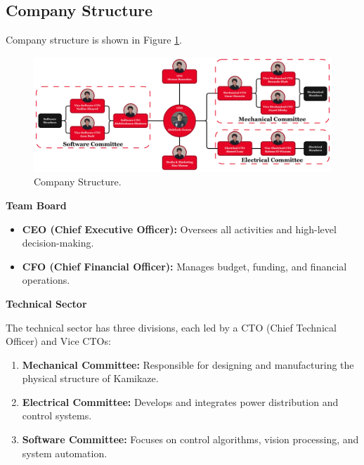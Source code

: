 \subsection{Company Structure}

Company structure is shown in Figure \ref{fig:company_structure}.

\begin{figure}[h]
    \centering
    \includegraphics[width=\columnwidth]{Sections/5Logistics/images/ROV hierarchy.png}
    \caption{Company Structure.}
    \label{fig:company_structure}
\end{figure}

\textbf{Team Board}
\vspace{-0.5\baselineskip}
\begin{itemize}[leftmargin=0pt, itemindent=20pt]
    \setlength{\itemsep}{0pt}
    \item \textbf{CEO (Chief Executive Officer):} Oversees all activities and high-level decision-making.
    \item \textbf{CFO (Chief Financial Officer):} Manages budget, funding, and financial operations.
\end{itemize}

\textbf{Technical Sector}

The technical sector has three divisions, each led by a CTO (Chief Technical Officer) and Vice CTOs:
\vspace{-0.5\baselineskip}
\begin{enumerate}[leftmargin=0pt, itemindent=20pt]
    \setlength{\itemsep}{0pt}
    \item \textbf{Mechanical Committee:} Responsible for designing and manufacturing the physical structure of Kamikaze.
    \item \textbf{Electrical Committee:} Develops and integrates power distribution and control systems.
    \item \textbf{Software Committee:} Focuses on control algorithms, vision processing, and system automation.
\end{enumerate}


